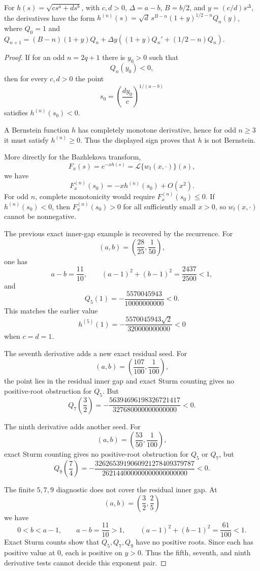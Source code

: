 \begin{lemma}
\label{res:bazhlekova-odd-derivative-polynomial-normal-form}
For \(h(s)=\sqrt{c s^a+d s^b}\), with \(c,d>0\), \(\Delta=a-b\), \(B=b/2\), and \(y=(c/d)s^\Delta\), the derivatives have the form \(h^{(n)}(s)=\sqrt d\,s^{B-n}(1+y)^{1/2-n}Q_n(y)\), where \(Q_0=1\) and \(Q_{n+1}=(B-n)(1+y)Q_n+\Delta y((1+y)Q_n'+(1/2-n)Q_n)\).
\end{lemma}
\begin{proof}
If for an odd \(n=2q+1\) there is \(y_0>0\) such that
\[
Q_n(y_0)<0,
\]
then for every \(c,d>0\) the point
\[
s_0=\left(\frac{d y_0}{c}\right)^{1/(a-b)}
\]
satisfies \(h^{(n)}(s_0)<0\).

A Bernstein function \(h\) has completely monotone derivative, hence for odd \(n\ge3\) it must satisfy \(h^{(n)}\ge0\). Thus the displayed sign proves that \(h\) is not Bernstein.

More directly for the Bazhlekova transform,
\[
F_x(s)=e^{-x h(s)}=\mathcal L\{w_t(x,\cdot)\}(s),
\]
we have
\[
F_x^{(n)}(s_0)=-x h^{(n)}(s_0)+O(x^2).
\]
For odd \(n\), complete monotonicity would require \(F_x^{(n)}(s_0)\le0\). If \(h^{(n)}(s_0)<0\), then \(F_x^{(n)}(s_0)>0\) for all sufficiently small \(x>0\), so \(w_t(x,\cdot)\) cannot be nonnegative.

The previous exact inner-gap example is recovered by the recurrence. For
\[
(a,b)=\left(\frac{28}{25},\frac1{50}\right),
\]
one has
\[
a-b=\frac{11}{10},\qquad
(a-1)^2+(b-1)^2=\frac{2437}{2500}<1,
\]
and
\[
Q_5(1)=-\frac{5570045943}{10000000000}<0.
\]
This matches the earlier value
\[
h^{(5)}(1)
=-\frac{5570045943\sqrt2}{320000000000}<0
\]
when \(c=d=1\).

The seventh derivative adds a new exact residual seed. For
\[
(a,b)=\left(\frac{107}{100},\frac1{100}\right),
\]
the point lies in the residual inner gap and exact Sturm counting gives no positive-root obstruction for \(Q_5\). But
\[
Q_7\left(\frac32\right)
=-\frac{56394696198326721417}{327680000000000000}<0.
\]

The ninth derivative adds another seed. For
\[
(a,b)=\left(\frac{53}{50},\frac1{100}\right),
\]
exact Sturm counting gives no positive-root obstruction for \(Q_5\) or \(Q_7\), but
\[
Q_9\left(\frac74\right)
=-\frac{3262653919060921278409379787}
{262144000000000000000000}<0.
\]

The finite \(5,7,9\) diagnostic does not cover the residual inner gap. At
\[
(a,b)=\left(\frac32,\frac25\right)
\]
we have
\[
0<b<a-1,\qquad a-b=\frac{11}{10}>1,\qquad
(a-1)^2+(b-1)^2=\frac{61}{100}<1.
\]
Exact Sturm counts show that \(Q_5,Q_7,Q_9\) have no positive roots. Since each has positive value at \(0\), each is positive on \(y>0\). Thus the fifth, seventh, and ninth derivative tests cannot decide this exponent pair.


\end{proof}
